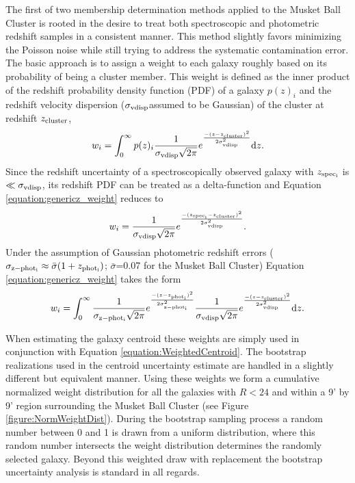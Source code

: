 The first of two membership determination methods applied to the Musket Ball Cluster is rooted in the desire to treat both spectroscopic and photometric redshift samples in a consistent manner. 
This method slightly favors minimizing the Poisson noise while still trying to address the systematic contamination error. 
The basic approach is to assign a weight to each galaxy roughly based on its probability of being a cluster member.
This weight is defined as the inner product of the redshift probability density function (PDF) of a galaxy $p(z)_i$ and the redshift velocity dispersion ($\sigma_{\rm vdisp}$assumed to be Gaussian) of the cluster at redshift $z_{\rm cluster}$,
\begin{equation}
w_i = \int_{0}^{\infty} p(z)_i \frac{1}{\sigma_{\rm vdisp}\sqrt{2\pi}}e^{\frac{-(z-z_{\rm cluster})^2}{2\sigma_{\rm vdisp}^2}}\mathrm{d}z.
\label{equation:genericz_weight}
\end{equation}
Since the redshift uncertainty of a spectroscopically observed galaxy with $z_{\rm spec_{i}}$ is $\ll \sigma_{\rm vdisp}$, its redshift PDF can be treated as a delta-function and Equation \ref{equation:genericz_weight} reduces to
\begin{equation}
w_i = \frac{1}{\sigma_{\rm vdisp}\sqrt{2\pi}}e^{\frac{-(z_{\rm spec_{i}}-z_{\rm cluster})^2}{2\sigma_{\rm vdisp}^2}}.
\end{equation}\label{equation:specz_weight}
Under the assumption of Gaussian photometric redshift errors ($\sigma_{\rm z-phot_{i}} \approx \bar{\sigma}(1+z_{\rm phot_{i}})$; $\bar{\sigma}$=0.07 for the Musket Ball Cluster) Equation \ref{equation:genericz_weight} takes the form
\begin{equation}
w_i = \int_{0}^{\infty} \frac{1}{\sigma_{\rm z-phot_{i}}\sqrt{2\pi}}e^{\frac{-(z-z_{\rm phot_{i}})^2}{2\sigma_{\rm z-phot_{i}}^2}} \frac{1}{\sigma_{\rm vdisp}\sqrt{2\pi}}e^{\frac{-(z-z_{\rm cluster})^2}{2\sigma_{\rm vdisp}^2}}\mathrm{d}z.
\label{equation:photoz_weight}
\end{equation}

When estimating the galaxy centroid these weights are simply used in conjunction with Equation \ref{equation:WeightedCentroid}.
The bootstrap realizations used in the centroid uncertainty estimate are handled in a slightly different but equivalent manner.
Using these weights we form a cumulative normalized weight distribution for all the galaxies with $R<24$ and within a 9' by 9' region surrounding the Musket Ball Cluster (see Figure \ref{figure:NormWeightDist}).
During the bootstrap sampling process a random number between 0 and 1 is drawn from a uniform distribution, where this random number intersects the weight distribution determines the randomly selected galaxy.
Beyond this weighted draw with replacement the bootstrap uncertainty analysis is standard in all regards.

